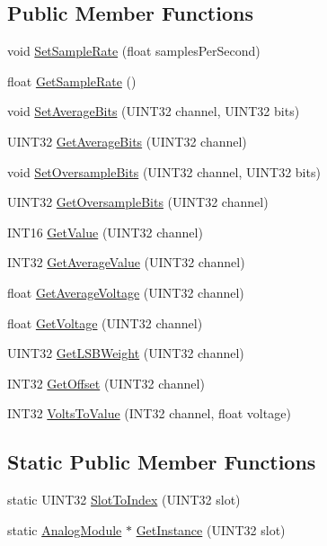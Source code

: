\subsection*{\-Public \-Member \-Functions}
\begin{DoxyCompactItemize}
\item 
void \hyperlink{classAnalogModule_a19bfb0c8ddf33573c4da105bee04b951}{\-Set\-Sample\-Rate} (float samples\-Per\-Second)
\item 
float \hyperlink{classAnalogModule_ab063044c14383369726b80ce93c334be}{\-Get\-Sample\-Rate} ()
\item 
void \hyperlink{classAnalogModule_a7c7f2eade6ca95f337d394c89f7f9da5}{\-Set\-Average\-Bits} (\-U\-I\-N\-T32 channel, \-U\-I\-N\-T32 bits)
\item 
\-U\-I\-N\-T32 \hyperlink{classAnalogModule_a5b5a1104a3415b5960d521f402b68f91}{\-Get\-Average\-Bits} (\-U\-I\-N\-T32 channel)
\item 
void \hyperlink{classAnalogModule_a556054af12905bd3d38972d15ecd08dc}{\-Set\-Oversample\-Bits} (\-U\-I\-N\-T32 channel, \-U\-I\-N\-T32 bits)
\item 
\-U\-I\-N\-T32 \hyperlink{classAnalogModule_acf3aa82998c5f22099a79d24f6c77861}{\-Get\-Oversample\-Bits} (\-U\-I\-N\-T32 channel)
\item 
\-I\-N\-T16 \hyperlink{classAnalogModule_a23f1793a4408e824b7d6b38295ea8be1}{\-Get\-Value} (\-U\-I\-N\-T32 channel)
\item 
\-I\-N\-T32 \hyperlink{classAnalogModule_a501c32dcebccd03057b9f01683431f4b}{\-Get\-Average\-Value} (\-U\-I\-N\-T32 channel)
\item 
float \hyperlink{classAnalogModule_ae74bde5efa97807ce42ad9834bb5b4b2}{\-Get\-Average\-Voltage} (\-U\-I\-N\-T32 channel)
\item 
float \hyperlink{classAnalogModule_a4c2875e0c44d93ea110bc3cf4f8d740e}{\-Get\-Voltage} (\-U\-I\-N\-T32 channel)
\item 
\-U\-I\-N\-T32 \hyperlink{classAnalogModule_a1cc2b9f90b5abaa42ddfde7cbbbf7d7c}{\-Get\-L\-S\-B\-Weight} (\-U\-I\-N\-T32 channel)
\item 
\-I\-N\-T32 \hyperlink{classAnalogModule_a3c428c04cb174c95dad6f2cb449b135f}{\-Get\-Offset} (\-U\-I\-N\-T32 channel)
\item 
\-I\-N\-T32 \hyperlink{classAnalogModule_a4d32e8352879088d4749efec89751313}{\-Volts\-To\-Value} (\-I\-N\-T32 channel, float voltage)
\end{DoxyCompactItemize}
\subsection*{\-Static \-Public \-Member \-Functions}
\begin{DoxyCompactItemize}
\item 
static \-U\-I\-N\-T32 \hyperlink{classAnalogModule_abb75added412545431fbc6a8fb6d6fbc}{\-Slot\-To\-Index} (\-U\-I\-N\-T32 slot)
\item 
static \hyperlink{classAnalogModule}{\-Analog\-Module} $\ast$ \hyperlink{classAnalogModule_a394c796dfcd6fb22404bfc5a50ecd56e}{\-Get\-Instance} (\-U\-I\-N\-T32 slot)
\end{DoxyCompactItemize}
